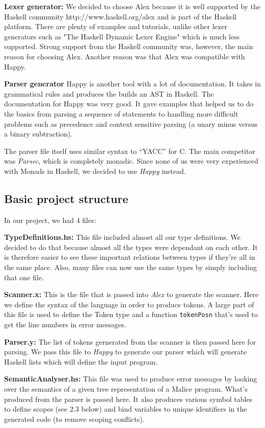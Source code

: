 \documentclass[a4wide, 10pt]{article}
\begin{document}
\textbf{Lexer generator:} We decided to choose Alex
because it is well supported by the Haskell community
http://www.haskell.org/alex and is part of the Haskell platform. There are
plenty of examples and tutorials, unlike other lexer generators such as "The
Haskell Dynamic Lexer Engine" which is much less supported. Strong support
from the Haskell community was, however, the main reason for choosing Alex.
Another reason was that Alex was compatible with Happy. 

\textbf{Parser generator} Happy is another tool with a lot of documentation.
It takes in grammatical rules and produces the builds an AST in Haskell. 
The documentation for Happy was very good. It gave examples that
helped us to do the basics from parsing a sequence of statements to handling more difficult
problems such as precedence and context sensitive parsing (a unary minus versus a binary subtraction).
 
The parser file itself uses similar syntax to ``YACC'' for
C. The main competitor was \textit{Parsec}, which is completely monadic.
Since none of us were very experienced with Monads in Haskell, we decided to
use \textit{Happy} instead.




\subsection{Basic project structure} In our project, we had 4 files:

\textbf{TypeDefinitions.hs:} This file included almost all our type
definitions. We decided to do that because almost all the types were dependant
on each other. It is therefore easier to see these important relations between
types if they're all in the same place. Also, many files can now use the same
types by simply including that one file.

\textbf{Scanner.x:} This is the file that is passed into \textit{Alex} to
generate the scanner. Here we define the syntax of the language in order to
produce tokens. A large part of this file is used to define the Token type and
a function \texttt{tokenPosn} that's used to get the line numbers in error
messages.

\textbf{Parser.y:} The list of tokens gernerated from the scanner is then
passed here for parsing. We pass this file to \textit{Happy} to generate our
parser which will generate Haskell lists which will define the input program.

\textbf{SemanticAnalyser.hs:} This file was used to produce error messages
by looking over the semantics of a given tree representation of a Malice
program. What's produced from the parser is passed here. It also produces
various symbol tables to define scopes (see 2.3 below) and bind variables to
unique identifiers in the generated code (to remove scoping conflicts).
\end{document}
